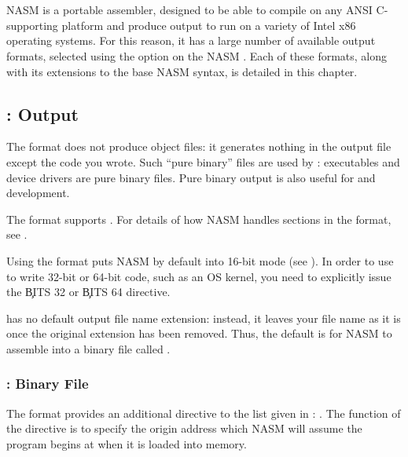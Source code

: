 \chapter{}
\label{ch:outfmt}

NASM is a portable assembler, designed to be able to compile on any
ANSI C-supporting platform and produce output to run on a variety of
Intel x86 operating systems. For this reason, it has a large number
of available output formats, selected using the  option
on the NASM . Each of these formats, along with
its extensions to the base NASM syntax, is detailed in this chapter.

\section{:  Output}
\label{sec:binfmt}

The  format does not produce object files: it generates
nothing in the output file except the code you wrote. Such ``pure
binary'' files are used by : 
executables and  device drivers are pure binary
files. Pure binary output is also useful for 
and  development.

The  format supports .
For details of how NASM handles sections in the  format,
see .

Using the  format puts NASM by default into 16-bit mode
(see ). In order to use  to write 32-bit
or 64-bit code, such as an OS kernel, you need to explicitly issue
the \c{BITS 32} or \c{BITS 64}
directive.

 has no default output file name extension: instead, it
leaves your file name as it is once the original extension has been
removed. Thus, the default is for NASM to assemble 
into a binary file called .

\subsection{: Binary File }
\label{subsec:binfmt}

The  format provides an additional directive to the list
given in : . The function of the
 directive is to specify the origin address which NASM
will assume the program begins at when it is loaded into memory.

